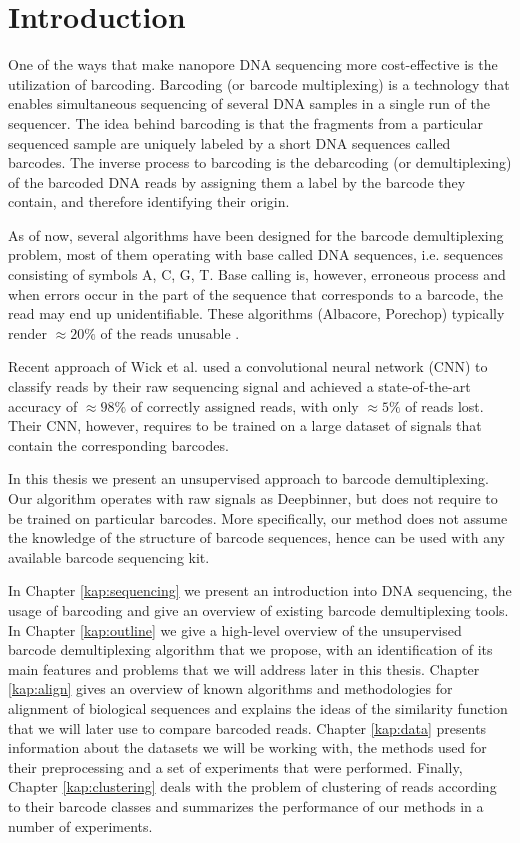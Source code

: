 \chapter*{Introduction} %

One of the ways that make nanopore DNA sequencing more cost-effective is the utilization of barcoding. Barcoding (or barcode multiplexing) is a technology that enables simultaneous sequencing of several DNA samples in a single run of the sequencer. The idea behind barcoding is that the fragments from a particular sequenced sample are uniquely labeled by a short DNA sequences called barcodes. The inverse process to barcoding is the debarcoding (or demultiplexing) of the barcoded DNA reads by assigning them a label by the barcode they contain, and therefore identifying their origin.

As of now, several algorithms have been designed for the barcode demultiplexing problem, most of them operating with base called DNA sequences, i.e. sequences consisting of symbols A, C, G, T. Base calling is, however, erroneous process and when errors occur in the part of the sequence that corresponds to a barcode, the read may end up unidentifiable. These algorithms (Albacore, Porechop) typically render $\approx 20\%$ of the reads unusable \cite{Deepbinner}.

Recent approach of Wick et al. \cite{Deepbinner} used a convolutional neural network (CNN) to classify reads by their raw sequencing signal and achieved a state-of-the-art accuracy of $\approx 98\%$ of correctly assigned reads, with only $\approx 5\%$ of reads lost. Their CNN, however, requires to be trained on a large dataset of signals that contain the corresponding barcodes.

In this thesis we present an unsupervised approach to barcode demultiplexing. Our algorithm operates with raw signals as Deepbinner, but does not require to be trained on particular barcodes. More specifically, our method does not assume the knowledge of the structure of barcode sequences, hence can be used with any available barcode sequencing kit.

In Chapter \ref{kap:sequencing} we present an introduction into DNA sequencing, the usage of barcoding and give an overview of existing barcode demultiplexing tools. In Chapter \ref{kap:outline} we give a high-level overview of the unsupervised barcode demultiplexing algorithm that we propose, with an identification of its main features and problems that we will address later in this thesis. Chapter \ref{kap:align} gives an overview of known algorithms and methodologies for alignment of biological sequences and explains the ideas of the similarity function that we will later use to compare barcoded reads. Chapter \ref{kap:data} presents information about the datasets we will be working with, the methods used for their preprocessing and a set of experiments that were performed. Finally, Chapter \ref{kap:clustering} deals with the problem of clustering of reads according to their barcode classes and summarizes the performance of our methods in a number of experiments.
